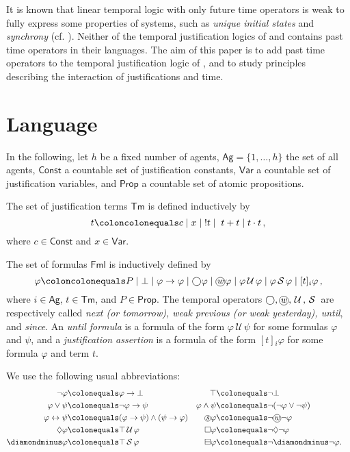 \documentclass[envcountsect,envcountsame,oribibl,orivec]{llncs}
\newcommand*\circled[1]{\tikz[baseline=(char.base)]{
		\node[shape=circle,draw,inner sep=0.4pt] (char) {#1};}}
\newcommand{\Prop}{\textsf{Prop}}
\newcommand{\Formulae}{\textsf{Fml}}
\newcommand{\lfalse}{\bot}
\newcommand{\lneg}{\neg}
\newcommand{\limplies}{\rightarrow}
\newcommand{\liff}{\leftrightarrow}
\newcommand{\lnext}{\bigcirc}
\newcommand{\lalways}{\Box}
\newcommand{\leventually}{\Diamond}
\newcommand{\lonce}{\diamondminus}
\newcommand{\lsofar}{\boxminus}
\newcommand{\luntil}{{\,\mathcal{U}\,}}
\newcommand{\lsince}{{\,\mathcal{S}\,}}
\newcommand{\wprevious}{\circled{\textit{w}}}
\newcommand{\sprevious}{\circled{\textit{s}}}
\newcommand{\CTerms}{\textsf{Const}}
\newcommand{\VTerms}{\textsf{Var}}
\newcommand{\Terms}{\textsf{Tm}}
\newcommand{\Ag}{\textsf{Ag}}
\newcommand{\jbox}[1]{\left[#1\right]\!}
\newcommand{\tapp}{\cdot}
\newcommand{\tinspect}{!}
\newcommand{\numberofagents}{h}
\newcommand{\agent}{i}
\renewcommand{\phi}{\varphi}
\begin{document}
It is known that linear temporal logic with only future time operators is weak to fully express some properties of systems, such as \textit{unique initial states} and \textit{synchrony} (cf. \cite{HvdMV04,FrenchMeydenReynolds2004}). Neither  of the temporal justification logics of \cite{Bucheli15} and \cite{BucheliGhariStuder2017} contains past time operators in their languages. The aim of this paper is to add past time operators to the temporal justification logic of \cite{BucheliGhariStuder2017}, and to study principles describing the interaction of justifications and time.


 \section{Language}
 \label{sec:Syntax}

  In the following, let $\numberofagents$ be a fixed number of agents, $\Ag = \{1, \ldots, \numberofagents \}$ the set of all agents, $\CTerms$ a countable set of justification constants, $\VTerms$ a countable set of justification variables, and $\Prop$ a countable set of atomic propositions.

 The set of justification terms $\Terms$ is defined inductively by
 \[
  t \coloncolonequals c \mid x \mid \; \tinspect t \mid \;  t + t \mid t \tapp t \, ,
 \]
 where $c \in \CTerms$ and $x \in \VTerms$.

 The set of formulas $\Formulae$ is inductively defined by 
 \[
  \phi \coloncolonequals P \mid \lfalse \mid \phi \limplies \phi \mid \lnext \phi \mid \wprevious \phi \mid \phi \luntil \phi \mid \phi \lsince \phi \mid \jbox{t}_\agent\phi \, , 
 \]
 where $i \in \Ag$, $t \in \Terms$,  and $P \in \Prop$. The temporal operators $\lnext,\wprevious, \luntil,\lsince$ are respectively called \textit{next (or tomorrow), weak previous (or weak yesterday), until}, and \textit{since}. An \textit{until formula} is a formula of the form $\phi \luntil \psi$ for some formulas $\phi$ and $\psi$, and a \textit{justification assertion} is a formula of the form $\jbox{t}_i \phi$ for some formula $\phi$ and term $t$.

We use the following usual abbreviations:
 \begin{align*}
  \lneg \phi &\colonequals \phi \limplies \lfalse &
  \top &\colonequals \lneg \lfalse &\\
  \phi \lor \psi &\colonequals \lneg \phi \limplies \psi &
  \phi \land \psi &\colonequals \lneg (\lneg \phi \lor \lneg \psi) \\
  \phi \liff \psi &\colonequals (\phi \limplies \psi) \land (\psi \limplies \phi) & \sprevious \phi &\colonequals \neg \wprevious \neg \phi
   \\
  \leventually \phi &\colonequals \top \luntil \phi & \lalways \phi &\colonequals \lneg \leventually \lneg \phi  \\
 \lonce \phi &\colonequals \top \lsince \phi  & \lsofar \phi &\colonequals \lneg \lonce\lneg \phi.
 \end{align*}
\end{document}
